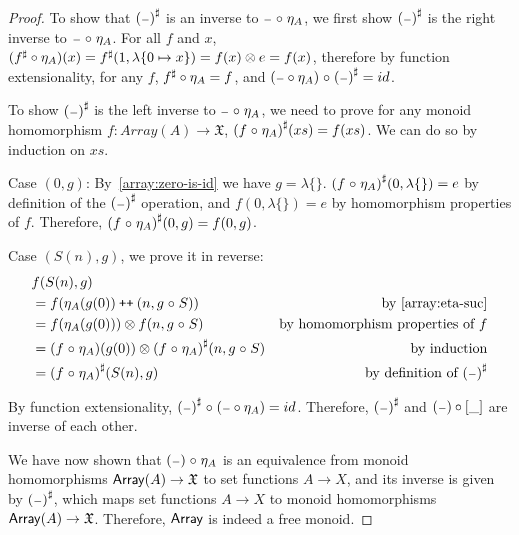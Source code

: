 \begin{proof}
    To show that ${({\scriptstyle{-}})}^{\sharp}$ is an inverse to ${\scriptstyle{-}} \mathrel{\circ} \eta_A$,
    we first show ${({\scriptstyle{-}})}^{\sharp}$ is the right inverse to ${\scriptstyle{-}} \mathrel{\circ} \eta_A$.
    For all $f$ and $x$, $({f}^{\sharp} \circ \eta_A)(x) = {f}^{\sharp}(1, \lambda\{0 \mapsto x\}) = f(x) \otimes e = f(x)$,
    therefore by function extensionality, for any $f$, ${f}^{\sharp} \circ \eta_A = f$,
    and $({\scriptstyle{-}} \circ \eta_A) \mathrel{\circ} {({\scriptstyle{-}})}^{\sharp} = id$.
    
    To show ${({\scriptstyle{-}})}^{\sharp}$ is the left inverse to ${\scriptstyle{-}} \mathrel{\circ} \eta_A$, we need to prove
    for any monoid homomorphism $f : Array(A) \to \mathfrak{X}$, ${(f \mathrel{\circ} \eta_A)}^{\sharp}(xs) = f(xs)$.
    We can do so by induction on $xs$.

    Case $(0, g)$:
    By~\ref{array:zero-is-id} we have $g = \lambda\{\}$.
    ${(f \mathrel{\circ} \eta_A)}^{\sharp}(0, \lambda\{\}) = e$ by definition of the ${({\scriptstyle{-}})}^{\sharp}$ operation,
    and $f(0, \lambda\{\}) = e$ by homomorphism properties of $f$.
    Therefore, ${(f \mathrel{\circ} \eta_A)}^{\sharp}(0, g) = f(0, g)$.

    Case $(S(n), g)$, we prove it in reverse: 
    \begin{align*}
        & f(S(n), g) \\
        & = f(\eta_A(g(0)) \mathbin{\text{\ttfamily\upshape ++}} (n, g \mathrel{\circ} S)) & \text{by~\ref{array:eta-suc}} \\
        & = f(\eta_A(g(0))) \otimes f(n, g \mathrel{\circ} S) & \text{by homomorphism properties of $f$} \\
        & = (f \mathrel{\circ} \eta_A)(g(0)) \otimes {(f \mathrel{\circ}\eta_A)}^{\sharp}(n, g \mathrel{\circ} S) & \text{by induction} \\
        & = {(f \mathrel{\circ} \eta_A)}^{\sharp}(S(n), g) & \text{by definition of ${({\scriptstyle{-}})}^{\sharp}$} 
    \end{align*}

    By function extensionality, ${({\scriptstyle{-}})}^{\sharp} \mathrel{\circ} ({\scriptstyle{-}} \circ \eta_A) = id$.
    Therefore, ${({\scriptstyle{-}})}^{\sharp}$ and $({\scriptstyle{-}}) \circ [\_]$ are inverse of each other.

    We have now shown that $({\scriptstyle{-}}) \mathrel{\circ} \eta_A$ is an equivalence from
    monoid homomorphisms $\operatorname{\mathsf{Array}}(A) \to \mathfrak{X}$
    to set functions $A \to X$, and its inverse is given by ${({\scriptstyle{-}})}^{\sharp}$, which maps set
    functions $A \to X$ to monoid homomorphisms $\operatorname{\mathsf{Array}}(A) \to \mathfrak{X}$. Therefore, $\operatorname{\mathsf{Array}}$ is indeed
    a free monoid.
    
\end{proof}

